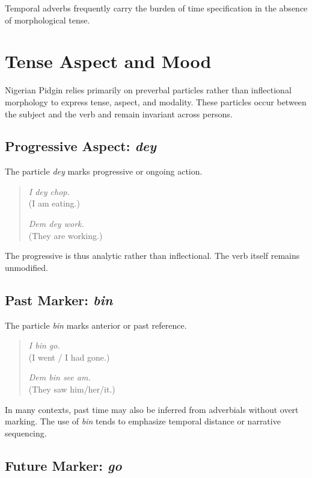 \documentclass[12pt]{article}
\begin{document}
Temporal adverbs frequently carry the burden of time specification in the absence of morphological tense.

\section{Tense Aspect and Mood}

Nigerian Pidgin relies primarily on preverbal particles rather than inflectional morphology to express tense, aspect, and modality. These particles occur between the subject and the verb and remain invariant across persons.

\subsection{Progressive Aspect: \textit{dey}}

The particle \textit{dey} marks progressive or ongoing action.

\begin{quote}
\textit{I dey chop.} \\
(I am eating.)

\textit{Dem dey work.} \\
(They are working.)
\end{quote}

The progressive is thus analytic rather than inflectional. The verb itself remains unmodified.

\subsection{Past Marker: \textit{bin}}

The particle \textit{bin} marks anterior or past reference.

\begin{quote}
\textit{I bin go.} \\
(I went / I had gone.)

\textit{Dem bin see am.} \\
(They saw him/her/it.)
\end{quote}

In many contexts, past time may also be inferred from adverbials without overt marking. The use of \textit{bin} tends to emphasize temporal distance or narrative sequencing.

\subsection{Future Marker: \textit{go}}
\end{document}
